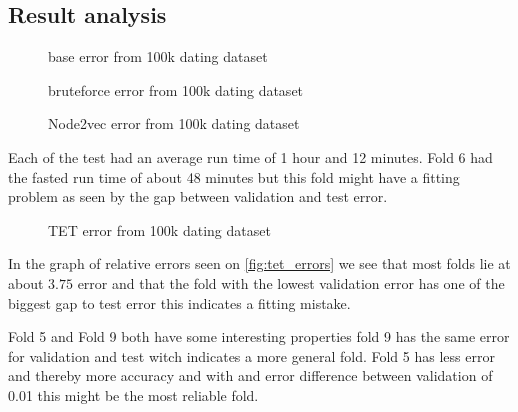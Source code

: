 \subsection{Result analysis}

\begin{figure}[H]
	\centering
	\begin{adjustbox}{width=0.5\textwidth}
		
	\end{adjustbox}
	\caption{base error from 100k dating dataset }
	\label{fig:base_errors}
\end{figure}

\begin{figure}[H]
	\centering
	\begin{adjustbox}{width=0.5\textwidth}
		
	\end{adjustbox}
	\caption{bruteforce error from 100k dating dataset }
	\label{fig:brute_errors}
\end{figure}

\begin{figure}[H]
	\centering
	\begin{adjustbox}{width=0.5\textwidth}
		
	\end{adjustbox}
	\caption{Node2vec error from 100k dating dataset }
	\label{fig:N2V_errors}
\end{figure}


Each of the test had an average run time of 1 hour and 12 minutes.  Fold 6 had the fasted run time of about 48 minutes but this fold might have a fitting problem as seen by the gap between validation and test error.

\begin{figure}[H]
	\centering
	\begin{adjustbox}{width=0.5\textwidth}
		
	\end{adjustbox}
	\caption{TET error from 100k dating dataset }
	\label{fig:tet_errors}
\end{figure}

In the graph of relative errors seen on \autoref{fig:tet_errors} we see that most folds lie at about $3.75$ error and that the fold with the lowest validation error has one of the biggest gap to test error this indicates a fitting mistake. 

Fold 5 and Fold 9 both have some interesting properties fold 9 has the same error for validation and test witch indicates a more general fold. Fold 5 has less error and thereby more accuracy and with and error difference between validation of 0.01 this might be the most reliable fold.


%		

